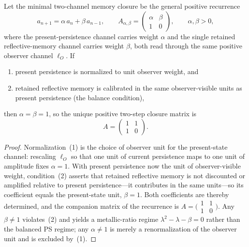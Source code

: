 \begin{lemma}
\label{lemma:bk5_balanced_observer_normalization}
Let the minimal two-channel memory closure be the general positive recurrence
\[
a_{n+1}=\alpha\,a_n+\beta\,a_{n-1},
\qquad
A_{\alpha,\beta}=\begin{pmatrix}\alpha&\beta\\1&0\end{pmatrix},
\qquad \alpha,\beta>0,
\]
where the present-persistence channel carries weight $\alpha$ and the single
retained reflective-memory channel carries weight $\beta$, both read through the
same positive observer channel $\ell_O$. If
\begin{enumerate}
\item present persistence is normalized to unit observer weight, and
\item retained reflective memory is calibrated in the same observer-visible
units as present persistence (the balance condition),
\end{enumerate}
then $\alpha=\beta=1$, so the unique positive two-step closure matrix is
\[
A=\begin{pmatrix}1&1\\1&0\end{pmatrix}.
\]
\end{lemma}

\begin{proof}
\label{proof:bk5_balanced_observer_normalization}
Normalization~(1) is the choice of observer unit for the present-state channel:
rescaling $\ell_O$ so that one unit of current persistence maps to one unit of
amplitude fixes $\alpha=1$. With present persistence now the unit of
observer-visible weight, condition~(2) asserts that retained reflective memory is
not discounted or amplified relative to present persistence---it contributes in
the same units---so its coefficient equals the present-state unit, $\beta=1$.
Both coefficients are thereby determined, and the companion matrix of the
recurrence is $A=\big(\begin{smallmatrix}1&1\\1&0\end{smallmatrix}\big)$. Any
$\beta\neq 1$ violates~(2) and yields a metallic-ratio regime
$\lambda^2-\lambda-\beta=0$ rather than the balanced PS regime; any $\alpha\neq 1$
is merely a renormalization of the observer unit and is excluded by~(1).
\end{proof}

